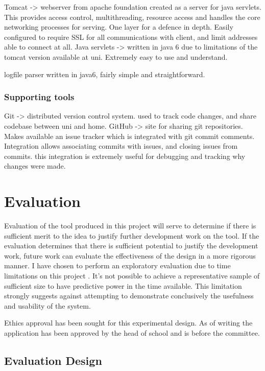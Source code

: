Tomcat -> webserver from apache foundation created as a server for java servlets. This provides access control, multithreading, resource access and handles the core networking processes for serving. One layer for a defence in depth. Easily configured to require SSL for all communications with client, and limit addresses able to connect at all.
Java servlets -> written in java 6 due to limitations of the tomcat version available at uni. Extremely easy to use and understand.

logfile parser written in java6, fairly simple and straightforward.

\subsubsection{Supporting tools}
Git -> distributed version control system. used to track code changes, and share codebase between uni and home.
GitHub -> site for sharing git repositories. Makes available an issue tracker which is integrated with git commit comments. Integration allows associating commits with issues, and closing issues from commits. this integration is extremely useful for debugging and tracking why changes were made.



\section{Evaluation}\label{eval}

Evaluation of the tool produced in this project will serve to determine if there is sufficient merit to the idea to justify further development work on the tool. If the evaluation determines that there is sufficient potential to justify the development work, future work can evaluate the effectiveness of the design in a more rigorous manner. I have chosen to perform an exploratory evaluation due to time limitations on this project \cite{Ellis:2006:EAU:1168149.1168152}. It's not possible to achieve a representative sample of sufficient size to have predictive power in the time available. This limitation strongly suggests against attempting to demonstrate conclusively the usefulness and usability of the system. 

Ethics approval has been sought for this experimental design. As of writing the application has been approved by the head of school and is before the committee.
\subsection{Evaluation Design}

